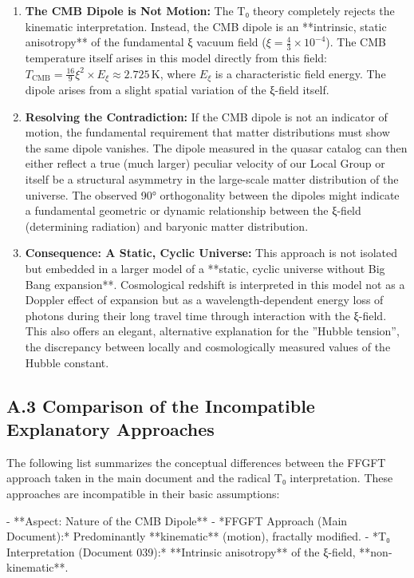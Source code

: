 \documentclass[12pt,a4paper]{article}
\begin{document}
	\begin{enumerate}
		\item \textbf{The CMB Dipole is Not Motion:} The T₀ theory completely rejects the kinematic interpretation. Instead, the CMB dipole is an **intrinsic, static anisotropy** of the fundamental ξ vacuum field ($ \xi = \frac{4}{3} \times 10^{-4} $). The CMB temperature itself arises in this model directly from this field: $ T_{\text{CMB}} = \frac{16}{9} \xi^2 \times E_\xi \approx 2.725 \, \text{K} $, where $E_\xi$ is a characteristic field energy. The dipole arises from a slight spatial variation of the ξ-field itself.
		
		\item \textbf{Resolving the Contradiction:} If the CMB dipole is not an indicator of motion, the fundamental requirement that matter distributions must show the same dipole vanishes. The dipole measured in the quasar catalog can then either reflect a true (much larger) peculiar velocity of our Local Group or itself be a structural asymmetry in the large-scale matter distribution of the universe. The observed 90° orthogonality between the dipoles might indicate a fundamental geometric or dynamic relationship between the ξ-field (determining radiation) and baryonic matter distribution.
		
		\item \textbf{Consequence: A Static, Cyclic Universe:} This approach is not isolated but embedded in a larger model of a **static, cyclic universe without Big Bang expansion**. Cosmological redshift is interpreted in this model not as a Doppler effect of expansion but as a wavelength-dependent energy loss of photons during their long travel time through interaction with the ξ-field. This also offers an elegant, alternative explanation for the ''Hubble tension'', the discrepancy between locally and cosmologically measured values of the Hubble constant.
	\end{enumerate}
	
	\subsection*{A.3 Comparison of the Incompatible Explanatory Approaches}
	
	The following list summarizes the conceptual differences between the FFGFT approach taken in the main document and the radical T₀ interpretation. These approaches are incompatible in their basic assumptions:
	
	- **Aspect: Nature of the CMB Dipole**
	- *FFGFT Approach (Main Document):* Predominantly **kinematic** (motion), fractally modified.
	- *T₀ Interpretation (Document 039):* **Intrinsic anisotropy** of the ξ-field, **non-kinematic**.
	
\end{document}
